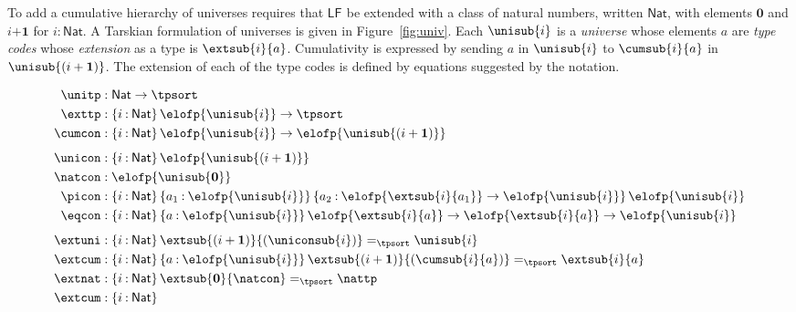 \documentclass[11pt,twoside]{article}
\newcommand{\braces}[1]{\{#1\}}
\newcommand{\parens}[1]{(#1)}
\newcommand{\LF}[1][]{\ensuremath{\mathsf{LF}_{#1}}}
\newcommand{\eqclass}[3]{{#2}=_{#1}{#3}}
\newcommand{\piclass}[3]{\braces{{#2}\mathbin{:}{#1}}\,{#3}}
\newcommand{\arrclass}[2]{{#1}\to{#2}}
\newcommand{\natclass}{\ensuremath{\mathsf{Nat}}}
\newcommand{\zeroobj}{\mathbf{0}}
\newcommand{\succobj}[1]{{#1}\mathbin{\mathbf{+}}\mathbf{1}}
\begin{document}
To add a cumulative hierarchy of universes requires that \LF{} be extended with a class of
natural numbers, written $\natclass$, with elements $\zeroobj$ and $\succobj{i}$ for
$i:\natclass$.  A Tarskian formulation of universes is given in Figure~\ref{fig:univ}.
Each $\unisub{i}$ is a \emph{universe} whose elements $a$ are \emph{type codes} whose
\emph{extension} as a type is $\extsub{i}{a}$.  Cumulativity is expressed by sending $a$
in $\unisub{i}$ to $\cumsub{i}{a}$ in $\unisub{\parens{\succobj{i}}}$.  The extension of
each of the type codes is defined by equations suggested by the notation.

\begin{figure}[tp]

  \begin{align*}
    \unitp  & : \arrclass{\natclass}{\tpsort} \\
    \exttp    & : \piclass{\natclass}{i}{\arrclass{\elofp{\unisub{i}}}{\tpsort}} \\
    \cumcon & : \piclass{\natclass}{i}{\arrclass{\elofp{\unisub{i}}}{\elofp{\unisub{\parens{\succobj{i}}}}}} \\[1ex]
    \unicon & : \piclass{\natclass}{i}{\elofp{\unisub{\parens{\succobj{i}}}}} \\
    \natcon  & : \elofp{\unisub{\zeroobj}} \\
    \picon    & :
                \piclass{\natclass}{i}{
                \piclass{\elofp{\unisub{i}}}{a_{1}}{
                \piclass{\arrclass{\elofp{\extsub{i}{a_{1}}}}{\elofp{\unisub{i}}}}{a_{2}}{\elofp{\unisub{i}}}}} \\
    \eqcon  & :
              \piclass{\natclass}{i}{
              \piclass{\elofp{\unisub{i}}}{a}{
              \arrclass{\elofp{\extsub{i}{a}}}{\arrclass{\elofp{\extsub{i}{a}}}{\elofp{\unisub{i}}}}}} \\[1ex]
    \extuni & :
              \piclass{\natclass}{i}{
              \eqclass{\tpsort}{\extsub{\parens{\succobj{i}}}{\parens{\uniconsub{i}}}}{\unisub{i}}} \\
    \extcum & :
              \piclass{\natclass}{i}{
              \piclass{\elofp{\unisub{i}}}{a}{
              \eqclass
              {\tpsort}
              {\extsub{\parens{\succobj{i}}}{\parens{\cumsub{i}{a}}}}
              {\extsub{i}{a}}
              }}  \\
    \extnat & :
              \piclass{\natclass}{i}{
              \eqclass{\tpsort}{\extsub{\zeroobj}{\natcon}}{\nattp}} \\
    \extcum & :
              \piclass{\natclass}{i}{
}
\end{align*}
\end{figure}
\end{document}
